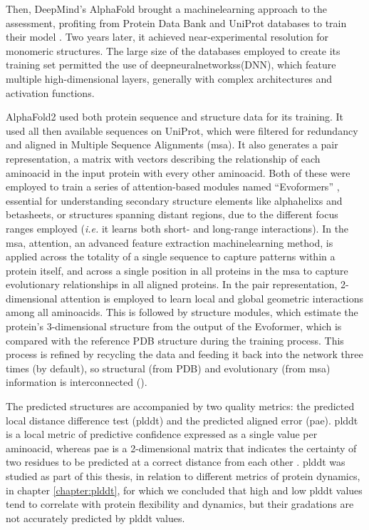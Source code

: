 Then, DeepMind's AlphaFold brought a \gls{machinelearning} approach to the assessment, profiting from Protein Data Bank and UniProt databases to train their model \cite{senior_improved_2020}. Two years later, it achieved near-experimental resolution \cite{jumper_highly_2021} for monomeric structures. The large size of the databases employed to create its training set permitted the use of \glspl{deepneuralnetworks}(DNN), which feature multiple high-dimensional layers, generally with complex architectures and activation functions.


AlphaFold2 used both protein sequence and structure data for its training. It used all then available sequences on UniProt, which were filtered for redundancy and aligned in Multiple Sequence Alignments (\gls{msa}). It also generates a pair representation, a matrix with vectors describing the relationship of each \gls{aminoacid} in the input protein with every other \gls{aminoacid}. Both of these were employed to train a series of \gls{attention}-based modules named ``Evoformers'' \cite{vaswani_attention_2023,jumper_highly_2021}, essential for understanding secondary structure elements like \glspl{alphahelix} and \glspl{betasheet}, or structures spanning distant regions, due to the different focus ranges employed (\textit{i.e.} it learns both short- and long-range interactions). In the \gls{msa}, \gls{attention}, an 
advanced feature extraction \gls{machinelearning} method, is applied across the totality of a single sequence to capture patterns within a protein itself, and across a single position in all proteins in the \gls{msa} to capture evolutionary relationships in all aligned proteins. In the pair representation, 2-dimensional \gls{attention} is employed to learn local and global geometric interactions among all \glspl{aminoacid}. This is followed by structure modules, which estimate the protein's 3-dimensional structure from the output of the Evoformer, which is compared with the reference PDB structure during the training process. This process is refined by recycling the data and feeding it back into the network three times (by default), so structural (from PDB) and evolutionary (from \gls{msa}) information is interconnected \cite{jumper_highly_2021} ().



The predicted structures are accompanied by two quality metrics: the predicted local distance difference test (\gls{plddt}) and the predicted aligned error (\gls{pae}). \gls{plddt} is a local metric of predictive confidence expressed as a single value per \gls{aminoacid}, whereas \gls{pae} is a 2-dimensional matrix that indicates the certainty of two residues to be predicted at a correct distance from each other \cite{jumper_highly_2021}. \gls{plddt} was studied as part of this thesis, in relation to different metrics of protein \gls{dynamics}, in chapter \ref{chapter:plddt}, for which we concluded that high and low \gls{plddt} values tend to correlate with protein \gls{flexibility} and \gls{dynamics}, but their gradations are not accurately predicted by \gls{plddt} values. 

